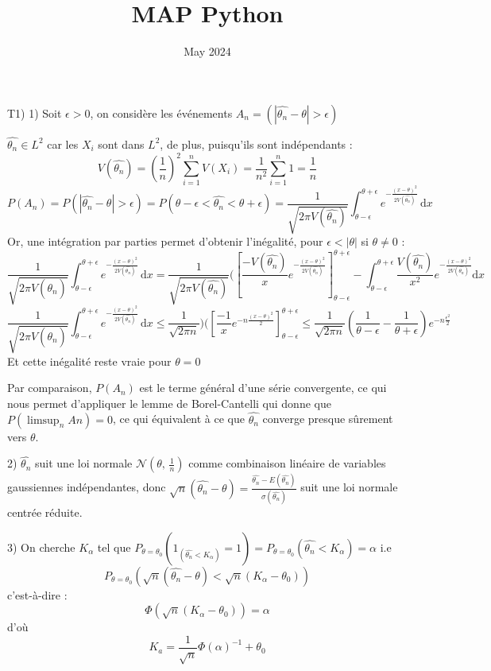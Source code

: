 \documentclass{article}
\title{MAP Python}
\author{ }
\date{May 2024}
\begin{document}
T1) 1) Soit $\epsilon > 0$,
on considère les événements $A_{n}=(|\hat{\theta_{n}} - \theta |>\epsilon)$


$\hat{\theta_{n}} \in L^{2}$ car les $X_{i}$ sont dans $L^{2}$, de plus, puisqu'ils sont indépendants :
$$V(\hat{\theta_{n}}) = (\frac{1}{n})^{2}\sum_{i=1}^{n}V(X_{i}) = \frac{1}{n^{2}}\sum_{i=1}^{n}1 = \frac{1}{n}$$
$$P(A_{n}) =  P(|\hat{\theta_{n}} - \theta |>\epsilon) = P( \theta - \epsilon < \hat{\theta_{n}} < \theta + \epsilon) =
\frac{1}{\sqrt{2\pi V(\hat{\theta_{n}}) }}\displaystyle \int_{\theta - \epsilon}^{\theta + \epsilon} e^{-\frac{(x-\theta)^{2}}{2V(\hat{\theta_{n}})}} \, \mathrm{d}x   $$
Or, une intégration par parties permet d'obtenir l'inégalité, pour $\epsilon < |\theta|$ si $\theta \neq 0$ :
$$
 \frac{1}{\sqrt{2\pi V(\hat{\theta_{n}}) }}\displaystyle \int_{\theta - \epsilon}^{\theta + \epsilon} e^{-\frac{(x-\theta)^{2}}{2V(\hat{\theta_{n}})}} \, \mathrm{d}x = \frac{1}{\sqrt{2\pi V(\hat{\theta_{n}}) }}(\left[\frac{-V(\hat{\theta_{n}})}{x}e^{-\frac{(x-\theta)^{2}}{2V(\hat{\theta_{n}})}}
\right]_{\theta - \epsilon}^{\theta + \epsilon} - \displaystyle \int_{\theta - \epsilon}^{\theta + \epsilon}\frac{V(\hat{\theta_{n}})}{x^{2}}e^{-\frac{(x-\theta)^{2}}{2V(\hat{\theta_{n}})}}\mathrm{d}x$$ 
$$ \frac{1}{\sqrt{2\pi V(\hat{\theta_{n}}) }}\displaystyle \int_{\theta - \epsilon}^{\theta + \epsilon} e^{-\frac{(x-\theta)^{2}}{2V(\hat{\theta_{n}})}} \, \mathrm{d}x \leq \frac{1}{\sqrt{2\pi n}}) (\left[\frac{-1}{x}e^{-n\frac{(x-\theta)^{2}}{2}}
\right]_{\theta - \epsilon}^{\theta + \epsilon} \leq \frac{1}{\sqrt{2\pi n}} (\frac{1}{\theta - \epsilon}-\frac{1}{\theta + \epsilon})e^{-n\frac{\epsilon^{2}}{2}} $$
Et cette inégalité reste vraie pour $\theta = 0$


Par comparaison, $P(A_{n})$ est le terme général d'une série convergente, ce qui nous permet d'appliquer le lemme de Borel-Cantelli qui donne que $P(\limsup_{n}An ) = 0$, ce qui équivalent à ce que $\hat{\theta_{n}}$ converge presque sûrement vers $\theta$.
\vspace{13pt}

2) $\hat{\theta_{n}}$ suit une loi normale $\mathcal{N}(\theta,\,\frac{1}{n})$ comme combinaison linéaire de variables gaussiennes indépendantes, donc $\sqrt{n}(\hat{\theta_{n}} - \theta) = \frac{\hat{\theta_{n}} - E(\hat{\theta_{n}})}{\sigma(\hat{\theta_{n}})}$ suit une loi normale centrée réduite.
\vspace{13pt}

3) On cherche $K_{\alpha}$ tel que $P_{\theta = \theta_{0}}(1_{(\hat{\theta_{n}} < K_{\alpha})} = 1 ) = P_{\theta = \theta_{0}}(\hat{\theta_{n}} < K_{\alpha}) = \alpha$ i.e $$P_{\theta = \theta_{0}}(\sqrt{n}(\hat{\theta_{n}} - \theta) < \sqrt{n}(K_{\alpha} - \theta_{0}))$$ c'est-à-dire : $$ \Phi(\sqrt{n}(K_{\alpha} - \theta_{0}))= \alpha
$$ d'où $$K_{a} = \frac{1}{\sqrt{n}}\Phi(\alpha)^{-1} + \theta_{0}$$
\end{document}
